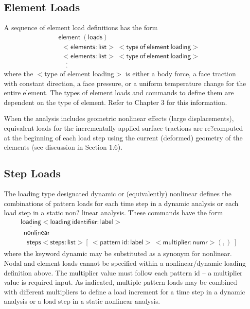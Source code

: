 \documentclass[11pt]{report}
\numberwithin{equation}{section}
\newcommand{\noi}{\noindent}
\newcommand{\ul} {\underline}
\newcommand{\hv} {\mathsf}   %
\begin{document}
\subsection{Element Loads}
\noi  A sequence of element load definitions has the form 
\begin{align*}
&\hv{\ul{element}\ (\ul{loads})}\\
&\ \ \hv{<elements:list>\ <type\ of\ element\ loading>}\\
&\ \ \hv{<elements:list>\ <type\ of\ element\ loading>}\\
&\ \ \ \ \ . \\
&\ \ \ \ \ . 
\end{align*}
\noi where the $<$type of element loading$>$ is either a body force, a face traction with constant
direction, a face pressure, or a uniform temperature change for the entire element. The
types of element loads and commands to define them are dependent on the type of element.
Refer to Chapter 3 for this information.

When the analysis includes geometric nonlinear effects (large displacements), 
equivalent loads for the incrementally applied surface tractions are re?computed at the beginning
of each load step using the current (deformed) geometry of the elements (see discussion in
Section 1.6).

\subsection{Step Loads}
\noi  The loading type designated dynamic or (equivalently) 
nonlinear defines the combinations
of pattern loads for each time step in a dynamic 
analysis or each load step in a static non?
linear analysis. These commands have the form
\begin{align*}
& \hv{\ul{loading} <loading\ identifier:label>} \\
&\ \ \hv{\ul{nonlinear}}\\
&\ \ \ \ \hv{\ul{step}s <steps:list> [ \ <pattern\ id:label>\ <multiplier:numr>(,)\ ]}
\end{align*}
\noi where the keyword dynamic may be substituted as a synonym for nonlinear. 
Nodal and element loads cannot be specified within a nonlinear/dynamic loading 
definition above. 
The multiplier value must follow each pattern id -- a multiplier value is required input. 
As indicated, multiple pattern loads may be combined with different multipliers to define a load
increment for a time step in a dynamic analysis or a load step in a static nonlinear analysis.
\end{document}
